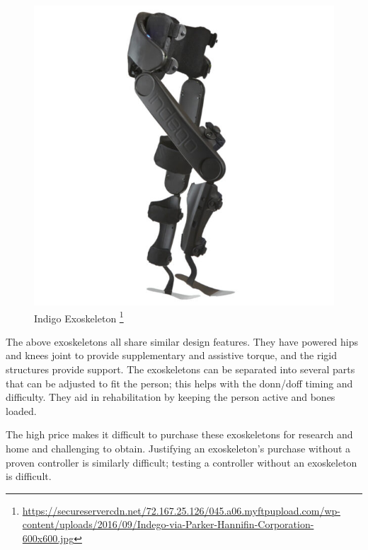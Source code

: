  \begin{figure}[H]
     \centering
     \includegraphics[scale=0.6]{images/background/Indego-via-Parker-Hannifin-Corporation-600x600.jpg}
     \caption[Indigo Exoskeleton]{Indigo Exoskeleton \protect\footnote{\url{https://secureservercdn.net/72.167.25.126/045.a06.myftpupload.com/wp-content/uploads/2016/09/Indego-via-Parker-Hannifin-Corporation-600x600.jpg}}}
     \label{fig:indigo}
 \end{figure}
 
 
 The above exoskeletons all share similar design features. They have powered hips and knees joint to provide supplementary and assistive torque, and the rigid structures provide support. The exoskeletons can be separated into several parts that can be adjusted to fit the person; this helps with the donn/doff timing and difficulty. They aid in rehabilitation by keeping the person active and bones loaded.  
 
The high price makes it difficult to purchase these exoskeletons for research and home and challenging to obtain. Justifying an exoskeleton's purchase without a proven controller is similarly difficult; testing a controller without an exoskeleton is difficult.
 
